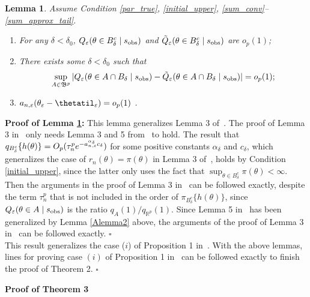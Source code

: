 \documentclass{article}
\newtheorem{lemma}{Lemma}
\begin{document}
\begin{lemma}\label{Alemma4} 
Assume Condition \ref{par_true}, \ref{initial_upper}, \ref{sum_conv}--\ref{sum_approx_tail}. 
	\begin{enumerate}
		\item[(i)] For any $\delta<\delta_{0}$, $Q_{\varepsilon}(\theta\in B_{\delta}^{c}\mid s_{\rm obs})$
		and $\tilde{Q}_{\varepsilon}(\theta\in B_{\delta}^{c}\mid s_{\rm obs})$ are $o_{p}(1)$; 
		\item[(ii)] There exists some $\delta<\delta_{0}$ such that 
		\[
		\sup_{A\in\mathfrak{B}^{p}}|Q_{\varepsilon}(\theta\in A\cap B_{\delta}\mid s_{\rm obs})-\tilde{Q}_{\varepsilon}(\theta\in A\cap B_{\delta}\mid s_{\rm obs})|=o_{p}(1);
		\]
		\item[(iii)] $a_{n,\veps}(\theta_{\veps}-\thetatil_{\veps})=o_{p}(1)$ . 
	\end{enumerate}\end{lemma}
{\bf Proof of Lemma \ref{Alemma4}:} 
	This lemma generalizes Lemma 3 of~\cite{Li2017}. The proof of Lemma 3 in~\cite{Li2017} only needs Lemma 3 and 5 from~\cite{Li2016} to hold. The result that  $q_{B_{\delta}^{c}}\{h(\theta)\}=O_{p}(\tau_{n}^{p}e^{-a_{n,\varepsilon}^{\alpha_{\delta}}c_{\delta}})$
	for some positive constants $\alpha_{\delta}$ and $c_{\delta}$, which generalizes the case of $r_{n}(\theta)=\pi(\theta)$ in Lemma 3 of~\cite{Li2016}, holds by Condition \ref{initial_upper}, since the latter only uses the fact that 
	$\sup_{\theta\in B_{\delta}^{c}}\pi(\theta)<\infty$.
	Then the arguments in the proof of Lemma 3 in~\cite{Li2016} can be followed exactly, despite the term $\tau_{n}^{p}$ that is not included in the order of $\pi_{B_{\delta}^{c}}\{h(\theta)\}$, since $Q_{\varepsilon}(\theta\in A\mid s_{{\rm obs}})$
	is the ratio $q_{A}(1)/q_{\mathbb{R}^{p}}(1)$. Since Lemma 5 in~\cite{Li2016} has been generalized by Lemma \eqref{Alemma2} above, the arguments of the proof of Lemma 3 in~\cite{Li2017} can be followed exactly.
	\hfill{$\square$} \\
	

This result generalizes the case ($i$)
of Proposition 1 in~\cite{Li2017}. With the above lemmas, lines for
proving case $(i)$ of Proposition 1 in~\cite{Li2017} can be followed
exactly to finish the proof of Theorem 2. 
\hfill{$\square$} 

{\bf Proof of Theorem 3}
\end{document}
